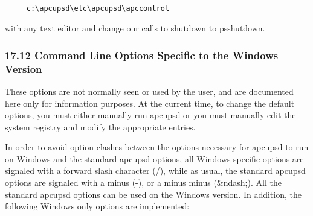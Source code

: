 \footnotesize
\begin{verbatim}
     
     c:\apcupsd\etc\apcupsd\apccontrol
\end{verbatim}
\normalsize

with any text editor and change our calls to shutdown to psshutdown. 

\label{Command-Line-Options-Specific-to-the-Windows-Version}

\subsubsection*{17.12 Command Line Options Specific to the Windows Version}

\label{index-Windows_002c-Options-186}
These options are not normally seen or used by the user, and are documented
here only for information purposes. At the current time, to change the default
options, you must either manually run apcupsd or you must manually edit the
system registry and modify the appropriate entries.  

In order to avoid option clashes between the options necessary for apcupsd to
run on Windows and the standard apcupsd options, all Windows specific options
are signaled with a forward slash character (/), while as usual, the standard
apcupsd options are signaled with a minus (-), or a minus minus (\&ndash;).
All the standard apcupsd options can be used on the Windows version. In
addition, the following Windows only options are implemented:  

